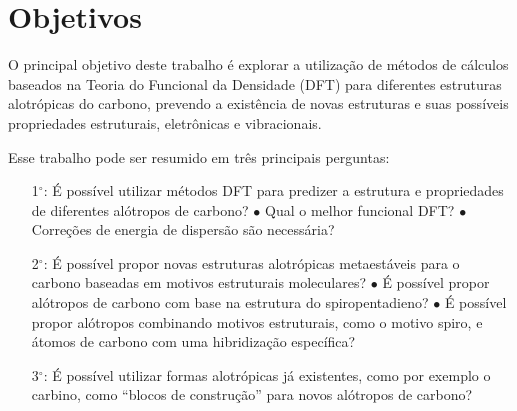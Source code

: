 

\chapter{Objetivos}

O principal objetivo deste trabalho é explorar a utilização de métodos de cálculos baseados na Teoria do Funcional da Densidade (DFT) para diferentes estruturas alotrópicas do carbono, prevendo a existência de novas estruturas e suas possíveis propriedades estruturais, eletrônicas e vibracionais. 

Esse trabalho pode ser resumido em três principais perguntas:

\begin{enumerate}
	
	\item[1$^{\circ}$:] É possível utilizar métodos DFT para predizer a estrutura e propriedades de diferentes alótropos de carbono?
		\subitem $\bullet$ Qual o melhor funcional DFT?
		\subitem $\bullet$ Correções de energia de dispersão são necessária?
	
	\item[2$^{\circ}$:] É possível propor novas estruturas alotrópicas metaestáveis para o carbono baseadas em motivos estruturais moleculares?
		\subitem $\bullet$ É possível propor alótropos de carbono com base na estrutura do spiropentadieno?
		\subitem $\bullet$ É possível propor alótropos combinando motivos estruturais, como o motivo spiro, e átomos de carbono com uma hibridização específica?

	\item[3$^{\circ}$:] É possível utilizar formas alotrópicas já existentes, como por exemplo o carbino, como “blocos de construção” para novos alótropos de carbono?
	
\end{enumerate}
